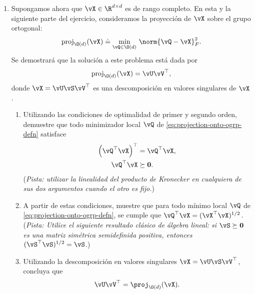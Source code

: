 \documentclass[../../book-main.tex]{subfiles}
\begin{document}
\begin{exercise}
\begin{enumerate}
        \item Supongamos ahora que $\vX \in \R^{d\times d}$ es de rango completo. En
            esta y la siguiente parte del ejercicio, consideramos la
            proyección de $\vX$ sobre el grupo ortogonal:
            \begin{equation}\label{eq:projection-onto-ogrp-defn}
                \mathrm{proj}_{\O(d)}(\vX) \doteq
                \min_{\vQ \in \O(d)
                }\, \norm{\vQ - \vX}_F^2.
            \end{equation}
            Se demostrará que la solución a este problema está dada por
            \begin{equation*}
                \mathrm{proj}_{\O(d)}(\vX)
                =
                \vU \vV^\top,
            \end{equation*}
            donde $\vX = \vU \vS \vV^\top$ es una descomposición en valores singulares
            de $\vX$.

            \begin{enumerate}
                \item Utilizando las condiciones de optimalidad de primer y segundo orden,
                    demuestre que todo minimizador local $\vQ$
                    de \eqref{eq:projection-onto-ogrp-defn} satisface 
                    \begin{align*}
                        \left( \vQ^\top \vX \right)^\top &= \vQ^\top \vX, \\
                        \vQ^\top \vX &\succeq \mathbf{0}.
                    \end{align*}
                    (\textit{Pista: utilizar la linealidad del producto de Kronecker
                            en cualquiera de sus dos argumentos cuando el
                    otro es fijo.})
                \item A partir de estas condiciones, muestre que para todo
                    mínimo local $\vQ$ de
                    \eqref{eq:projection-onto-ogrp-defn}, se cumple que
                    $\vQ^\top \vX = (\vX^\top \vX)^{1/2}$. 
                    (\textit{Pista: Utilice %
                            el siguiente resultado clásico de álgebra lineal: si $\vS \succeq
                            \mathbf{0}$ es una matriz simétrica semidefinida positiva,
                    entonces $(\vS^\top\vS)^{1/2} = \vS$.})
                \item Utilizando la descomposición en valores singulares $\vX =
                    \vU \vS \vV^\top$, concluya que 
                    \begin{equation*}
                        \vU \vV^\top
                        =
                        \proj_{\O(d)}(\vX).
                    \end{equation*}
            \end{enumerate}
    \end{enumerate}
\end{exercise}
\end{document}
